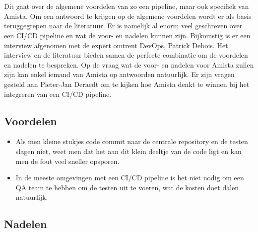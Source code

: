 
\chapter{}
\label{ch:voor-en-nadelen-cicd}
Dit gaat over de algemene voordelen van zo een pipeline, maar ook specifiek van Amista. Om een antwoord te krijgen op de algemene voordelen wordt er als basis teruggegrepen naar de literatuur. Er is namelijk al enorm veel geschreven over een CI/CD pipeline en wat de voor- en nadelen kunnen zijn.
Bijkomstig is er een interview afgenomen met de expert omtrent DevOps, Patrick Debois.
Het interview en de literatuur bieden samen de perfecte combinatie om de voordelen en nadelen te bespreken.
Op de vraag wat de voor- en nadelen voor Amista zullen zijn kan enkel iemand van Amista op antwoorden natuurlijk. Er zijn vragen gesteld aan Pieter-Jan Deraedt om te kijken hoe Amista denkt te winnen bij het integreren van een CI/CD pipeline.


\section{Voordelen}
\label{sec:voordelen}
\begin{itemize}
    \item Als men kleine stukjes code commit naar de centrale repository en de testen slagen niet, weet men dat het aan dit klein deeltje van de code ligt en kan men de fout veel sneller opsporen.
    \item In de meeste omgevingen met een CI/CD pipeline is het niet nodig om een QA team te hebben om de testen uit te voeren, wat de kosten doet dalen natuurlijk.
\end{itemize}

\section{Nadelen}
\label{sec:nadelen}
